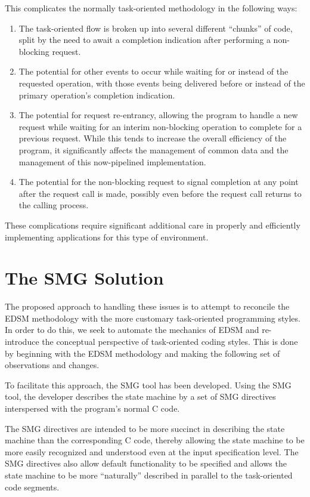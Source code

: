 This complicates the normally task-oriented methodology in the
following ways:
\begin{enumerate}
\item The task-oriented flow is broken up into several different
  ``chunks'' of code, split by the need to await a completion
  indication after performing a non-blocking request.
\item The potential for other events to occur while waiting for or
  instead of the requested operation, with those events being
  delivered before or instead of the primary operation's completion
  indication.
\item The potential for request re-entrancy, allowing the program to
  handle a new request while waiting for an interim non-blocking
  operation to complete for a previous request.  While this tends to
  increase the overall efficiency of the program, it significantly
  affects the management of common data and the management of this
  now-pipelined implementation.
\item The potential for the non-blocking request to signal completion
  at any point after the request call is made, possibly even before
  the request call returns to the calling process.
\end{enumerate}
These complications require significant additional care in properly
and efficiently implementing applications for this type of environment.


\section{The SMG Solution}

The proposed approach to handling these issues is to attempt to
reconcile the EDSM methodology with the more customary task-oriented
programming styles.  In order to do this, we seek to automate the
mechanics of EDSM and re-introduce the conceptual perspective of
task-oriented coding styles.  This is done by beginning with the EDSM
methodology and making the following set of observations and changes.

To facilitate this approach, the SMG tool has been developed.  Using
the SMG tool, the developer describes the state machine by a set of
SMG directives interspersed with the program's normal C code.  

The SMG directives are intended to be more succinct in describing the
state machine than the corresponding C code, thereby allowing the
state machine to be more easily recognized and understood even at the
input specification level.  The SMG directives also allow default
functionality to be specified and allows the state machine to be more
``naturally'' described in parallel to the task-oriented code
segments.

